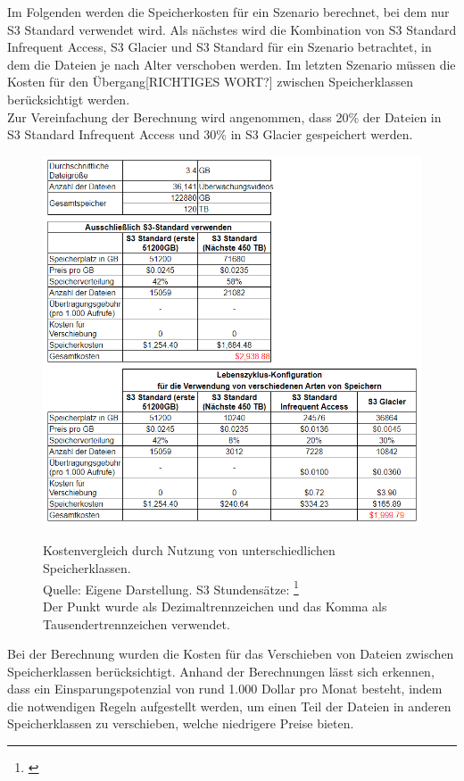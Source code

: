 Im Folgenden werden die Speicherkosten für ein Szenario berechnet, bei dem nur S3 Standard verwendet wird. Als nächstes wird die Kombination von S3 Standard Infrequent Access, S3 Glacier und S3 Standard für ein Szenario betrachtet, in dem die Dateien je nach Alter verschoben werden. Im letzten Szenario müssen die Kosten für den Übergang[RICHTIGES WORT?] zwischen Speicherklassen berücksichtigt werden.
\\
Zur Vereinfachung der Berechnung wird angenommen, dass 20\% der Dateien in S3 Standard Infrequent Access und 30\% in S3 Glacier gespeichert werden.
\\
\begin{figure}[h!]
  \centering
  \includegraphics[scale=0.75]{sources/Kostenvergleich_Nutzung_unt_Speicherklassen}
  \caption[Kostenvergleich durch Nutzung von unterschiedlichen Speicherklassen]{}\label{fig:Kostenvergleich_Nutzung_unt_Speicherklassen} 
  Kostenvergleich durch Nutzung von unterschiedlichen Speicherklassen.  \\
  Quelle: Eigene Darstellung. S3 Stundensätze: \footnote{\cite{AMZ09}}\\
Der Punkt wurde als Dezimaltrennzeichen und das Komma als Tausendertrennzeichen verwendet.
\end{figure}
Bei der Berechnung wurden die Kosten für das Verschieben von Dateien zwischen Speicherklassen berücksichtigt. 
Anhand der Berechnungen lässt sich erkennen, dass ein Einsparungspotenzial von rund 1.000 Dollar pro Monat besteht, indem die notwendigen Regeln aufgestellt werden, um einen Teil der Dateien in anderen Speicherklassen zu verschieben, welche niedrigere Preise bieten.

